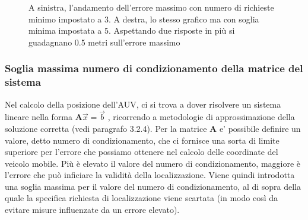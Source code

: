 \documentclass[Lau,binding=0.6cm]{sapthesis}
\begin{document}
\begin{figure}[H]
    \centering
    \hfill
    \caption{A sinistra, l'andamento dell'errore massimo con numero di richieste minimo impostato a 3. A destra, lo stesso grafico ma con soglia minima impostata a 5. Aspettando due risposte in più si guadagnano 0.5 metri sull'errore massimo}
\end{figure}
\subsubsection{Soglia massima numero di condizionamento della matrice del sistema}
\par
Nel calcolo della posizione dell'AUV, ci si trova a dover risolvere un sistema lineare nella forma  \(\textbf{A}\overrightarrow{x} = \overrightarrow{b} \) , ricorrendo a metodologie di approssimazione della soluzione corretta (vedi paragrafo 3.2.4). Per la matrice \(\textbf{A}\) e' possibile definire un valore, detto numero di condizionamento, che ci fornisce una sorta di limite superiore  per l'errore che possiamo ottenere nel calcolo delle coordinate del veicolo mobile. Più è elevato il valore del numero di condizionamento, maggiore è l'errore che può inficiare la validità della localizzazione. Viene quindi introdotta una soglia massima per il valore del numero di condizionamento, al di sopra della quale la specifica richiesta di localizzazione viene scartata (in modo così da evitare misure influenzate da un errore elevato).
\end{document}
